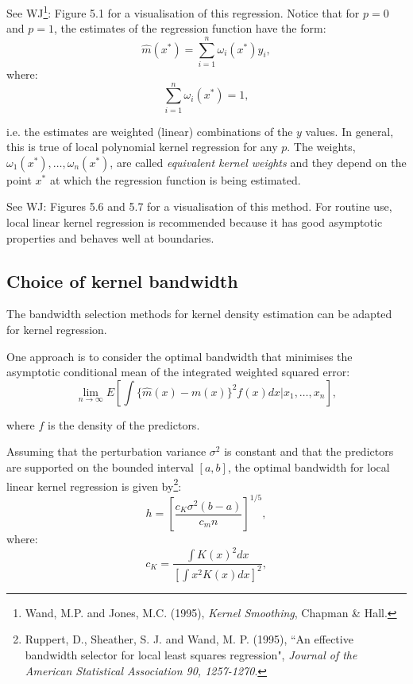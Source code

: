See WJ\footnote{Wand, M.P. and Jones, M.C. (1995), {\it Kernel Smoothing}, Chapman \& Hall.}: Figure 5.1 for a visualisation of this regression.
Notice that for $p = 0$ and $p = 1$, the estimates of the regression function have the form:
\begin{equation}
\hat{m}(x^*)=\sum^n_{i=1}\omega_i(x^*)y_i,
\end{equation}
where:
\begin{equation}
\sum^n_{i=1}\omega_i(x^*)=1,
\end{equation}

i.e. the estimates are weighted (linear) combinations of the $y$ values. In general, this is true of local polynomial kernel regression for any $p$. The weights, $\omega_1(x^*),\ldots,\omega_n(x^*)$, are called {\it equivalent kernel weights} and they depend on the point $x^*$ at which the regression function is being estimated.

See WJ: Figures 5.6 and 5.7 for a visualisation of this method.
For routine use, local linear kernel regression is recommended because it has good asymptotic properties and behaves well at boundaries.

\subsection{Choice of kernel bandwidth}

The bandwidth selection methods for kernel density estimation can be adapted for kernel regression.

One approach is to consider the optimal bandwidth that minimises the asymptotic conditional mean of the integrated weighted squared error:
\begin{equation}
\lim_{n\rightarrow\infty}E[\int\{\hat{m}(x)-m(x)\}^2f(x)dx|x_1,\ldots,x_n],
\end{equation}

where $f$ is the density of the predictors.

Assuming that the perturbation variance $\sigma^2$ is constant and that the predictors are supported on the bounded interval $[a, b]$, the optimal bandwidth for local linear kernel regression is given by\footnote{Ruppert, D., Sheather, S. J. and Wand, M. P. (1995), \textquotedblleft An effective bandwidth selector for local least squares regression", {\it Journal of the American Statistical Association 90, 1257-1270}.}:
\begin{equation}
h=[\frac{c_K\sigma^2(b-a)}{c_mn}]^{1/5},
\end{equation}
where: 
\begin{equation}
c_K=\frac{\int K(x)^2dx}{[\int x^2K(x)dx]^2},
\end{equation}

